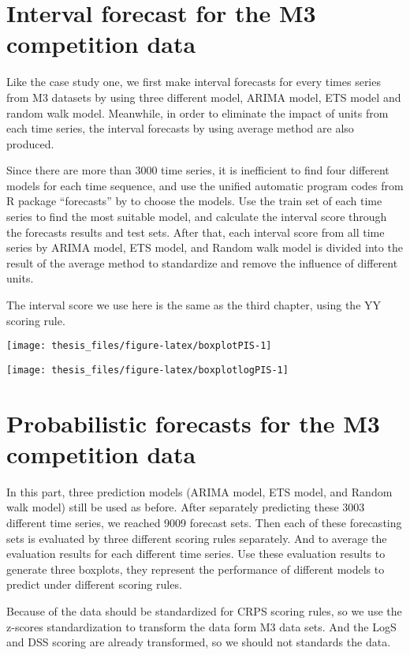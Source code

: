 \documentclass{monashthesis}
\theoremstyle{definition}
\theoremstyle{definition}
\theoremstyle{definition}
\theoremstyle{remark}
\begin{document}
\section{Interval forecast for the M3 competition
data}\label{interval-forecast-for-the-m3-competition-data}

Like the case study one, we first make interval forecasts for every
times series from M3 datasets by using three different model, ARIMA
model, ETS model and random walk model. Meanwhile, in order to eliminate
the impact of units from each time series, the interval forecasts by
using average method are also produced.

Since there are more than 3000 time series, it is inefficient to find
four different models for each time sequence, and use the unified
automatic program codes from R package ``forecasts'' by \textcite{RH181}
to choose the models. Use the train set of each time series to find the
most suitable model, and calculate the interval score through the
forecasts results and test sets. After that, each interval score from
all time series by ARIMA model, ETS model, and Random walk model is
divided into the result of the average method to standardize and remove
the influence of different units.

The interval score we use here is the same as the third chapter, using
the YY scoring rule.

\texttt{[image: thesis\_files/figure-latex/boxplotPIS-1]}

\texttt{[image: thesis\_files/figure-latex/boxplotlogPIS-1]}

\section{Probabilistic forecasts for the M3 competition
data}\label{probabilistic-forecasts-for-the-m3-competition-data}

In this part, three prediction models (ARIMA model, ETS model, and
Random walk model) still be used as before. After separately predicting
these 3003 different time series, we reached 9009 forecast sets. Then
each of these forecasting sets is evaluated by three different scoring
rules separately. And to average the evaluation results for each
different time series. Use these evaluation results to generate three
boxplots, they represent the performance of different models to predict
under different scoring rules.

Because of the data should be standardized for CRPS scoring rules, so we
use the z-scores standardization to transform the data form M3 data
sets. And the LogS and DSS scoring are already transformed, so we should
not standards the data.
\end{document}
